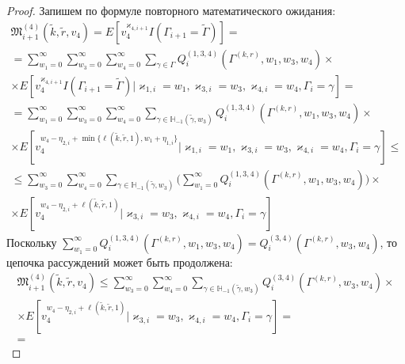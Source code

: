\documentclass[a4paper,12pt,russian]{extarticle}
\begin{document}
\begin{proof}
Запишем по формуле повторного математического ожидания:
\begin{multline}
\mathfrak{M}^{(4)}_{i+1}(\tilde{k},\tilde{r},v_4) = E[ v_4^{\varkappa_{4,i+1}}I(\Gamma_{i+1}=\tilde{\Gamma})] = \\ =
\sum_{w_1=0}^{\infty} \sum_{w_3=0}^{\infty}  \sum_{w_4=0}^{\infty} \sum_{\gamma \in \Gamma}  Q^{(1,3,4)}_i(\Gamma^{(k,r)},w_1, w_3,w_4) \times \\ \times 
E[v_4^{\varkappa_{4,i+1}}I(\Gamma_{i+1}=\tilde{\Gamma}) | \varkappa_{1,i}=w_1,\varkappa_{3,i}=w_3, \varkappa_{4,i}=w_4, \Gamma_i=\gamma] = \\ =
\sum_{w_1=0}^{\infty} \sum_{w_3=0}^{\infty} \sum_{w_4=0}^{\infty} \sum_{\gamma \in {\mathbb H}_{-1}(\tilde{\gamma},w_3)}  Q^{(1,3,4)}_i(\Gamma^{(k,r)},w_1, w_3,w_4) 
\times \\ \times E[ v_4^{w_4 - \eta_{2,i} + \min{\{\ell(\tilde{k},\tilde{r},1), w_1 + \eta_{1,i} \}}} | \varkappa_{1,i}=w_1,\varkappa_{3,i}=w_3, \varkappa_{4,i}=w_4, \Gamma_i=\gamma] \leqslant \\ \leqslant
 \sum_{w_3=0}^{\infty} \sum_{w_4=0}^{\infty}  \sum_{\gamma \in {\mathbb H}_{-1}(\tilde{\gamma},w_3)}  \bigl( \sum_{w_1=0}^{\infty}Q^{(1,3,4)}_i(\Gamma^{(k,r)},w_1, w_3,w_4) \bigr)
\times \\ \times E[ v_4^{w_4 - \eta_{2,i} + \ell(\tilde{k},\tilde{r},1)} | \varkappa_{3,i}=w_3, \varkappa_{4,i}=w_4, \Gamma_i=\gamma] 
\label{third:fourth:try:gen}
\end{multline}
Поскольку $\sum_{w_1=0}^{\infty}Q^{(1,3,4)}_i(\Gamma^{(k,r)},w_1, w_3,w_4) =Q^{(3,4)}_i(\Gamma^{(k,r)}, w_3,w_4) $, то цепочка рассуждений может быть продолжена:
\begin{multline*}
    \mathfrak{M}^{(4)}_{i+1}(\tilde{k},\tilde{r},v_4) \leqslant 
     \sum_{w_3=0}^{\infty}  \sum_{w_4=0}^{\infty} \sum_{\gamma \in {\mathbb H}_{-1}(\tilde{\gamma},w_3)}  Q^{(3,4)}_i(\Gamma^{(k,r)},w_3,w_4) 
\times \\ \times E[ v_4^{w_4 - \eta_{2,i} + \ell(\tilde{k},\tilde{r},1)} | \varkappa_{3,i}=w_3, \varkappa_{4,i}=w_4, \Gamma_i=\gamma] = \\ =

\end{multline*}
\end{proof}
\end{document}
